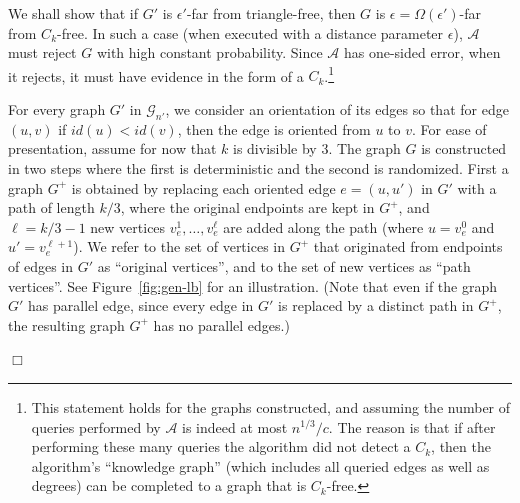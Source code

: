 \documentclass{article}
\newcommand{\eps}{\epsilon}
\newcommand{\mA}{{\mathcal{A}}}
\newcommand{\mG}{{\mathcal{G}}}
\newcommand{\trn}{{n'}}
\newcommand{\trG}{{G'}}
\newcommand{\treps}{{\eps'}}
\newenvironment{proofof}[1]{\smallskip\noindent{\bf Proof of #1:}}%
        {\hspace*{\fill}$\Box$\par}
\newcommand{\commentt}[1]{ {}}
\newcommand{\talya}[1]{{} }
\newcommand{\ForFuture}[1]{}
\begin{document}
\begin{proofof}{Theorem~\ref{thm:lb_ck_const_alpha}}
We shall show that 
if $\trG$ is $\treps$-far from triangle-free, then $G$ is $\eps=\Omega(\treps)$-far from $C_k$-free. In such a case (when executed with a distance parameter $\eps$),  $\mA$ must reject $G$ with high constant probability. Since $\mA$ has one-sided error, when it rejects, it must have evidence in the form of a $C_k$.\footnote{This statement holds for the graphs constructed, and assuming the number of queries performed by $\mA$ is indeed at most $n^{1/3}/c$. The reason is that if after performing these many queries the algorithm did not detect a $C_k$, then the algorithm's  ``knowledge graph'' (which includes all queried edges as well as degrees) can be completed to a graph that is $C_k$-free. \ForFuture{work on phrasing}}


For every graph $\trG$ in $\mG_{\trn}$,   we consider an orientation of its edges so that for  edge $(u,v)$  if $id(u)< id(v)$, 
then the edge is oriented from $u$ to $v$.  For ease of presentation, assume for now that $k$ is divisible by $3$.
The graph $G$ is constructed in two steps where the first is deterministic and the second is randomized. First a graph $G^+$ is obtained by replacing each oriented edge $e=(u,u')$ in $\trG$ with a path of length $k/3$, where the original endpoints are kept in $G^+$, and $\ell=k/3-1$ new vertices $v_{e}^1, \ldots, v_{e}^{\ell}$ are added along the path (where $u=v_{e}^0$ and $u'=v_e^{\ell+1}$).
We refer to the set of vertices in $G^+$ that originated from endpoints of edges in $\trG$ as ``original vertices'', and to the set of new vertices as ``path vertices''.
See Figure~\ref{fig:gen-lb} for an illustration.
(Note that even if the graph $\trG$ has parallel edge, since every edge in $\trG$ is replaced by a distinct path in $G^+$, the resulting graph $G^+$ has no parallel edges.)


\end{proofof}
\end{document}

